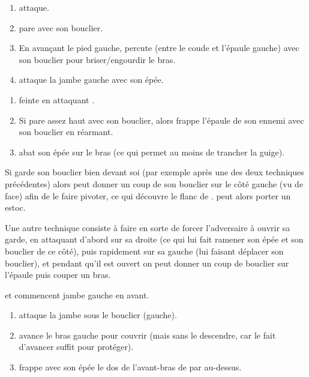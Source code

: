 \begin{technique}

\begin{enumerate}
	\item \A attaque.
	
	\item \D pare avec son bouclier.
	
	\item En avançant le pied gauche, \A percute \D (entre le coude et l'épaule gauche) avec son bouclier pour briser/engourdir le bras.
	
	\item \A attaque la jambe gauche avec son épée.
\end{enumerate}
\end{technique}


\begin{technique}

\begin{enumerate}
	\item \A feinte en attaquant \D.
	
	\item Si \D pare assez haut avec son bouclier, alors \A frappe l'épaule de son ennemi avec son bouclier en réarmant.
	
	\item \A abat son épée sur le bras (ce qui permet au moins de trancher la guige).
\end{enumerate}
\end{technique}


Si \D garde son bouclier bien devant soi (par exemple après une des deux techniques précédentes) alors \A peut donner un coup de son bouclier sur le côté gauche (vu de face) afin de le faire pivoter, ce qui découvre le flanc de \D.
\A peut alors porter un estoc.

Une autre technique consiste à faire en sorte de forcer l'adversaire à ouvrir sa garde, en attaquant d'abord sur sa droite (ce qui lui fait ramener son épée et son bouclier de ce côté), puis rapidement sur sa gauche (lui faisant déplacer son bouclier), et pendant qu'il est ouvert on peut donner un coup de bouclier sur l'épaule puis couper un bras.

\begin{technique}

\A et \D commencent jambe gauche en avant.

\begin{enumerate}
	\item \A attaque la jambe sous le bouclier (gauche).
	
	\item \D avance le bras gauche pour couvrir (mais sans le descendre, car le fait d'avancer suffit pour protéger).
	
	\item \D frappe avec son épée le dos de l'avant-bras de \A par au-dessus.
\end{enumerate}
\end{technique}

